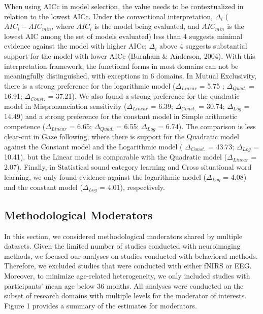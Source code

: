 \documentclass[10pt, letterpaper]{article}
\begin{document}
When using AICc in model selection, the value needs to be contextualized
in relation to the lowest AICc. Under the conventional interpretation,
\(\Delta_{i}\) (\(AIC_i - AIC_{min}\), where \(AIC_i\) is the model
being evaluated, and \(AIC_{min}\) is the lowest AIC among the set of
models evaluated) less than 4 suggests minimal evidence against the
model with higher AICc; \(\Delta_{i}\) above 4 suggests substantial
support for the model with lower AICc (Burnham \& Anderson, 2004). With
this interpretation framework, the functional forms in most domains can
not be meaningfully distinguished, with exceptions in 6 domains. In
Mutual Exclusivity, there is a strong preference for the logarithmic
model (\(\Delta_{Linear}\) = 5.75 ; \(\Delta_{Quad.}\) = 16.91;
\(\Delta_{Const.}\) = 37.21). We also found a strong preference for the
quadratic model in Mispronunciation sensitivity (\(\Delta_{Linear}\) =
6.39; \(\Delta_{Const.}\) = 30.74; \(\Delta_{Log}\) = 14.49) and a
strong preference for the constant model in Simple arithmetic competence
(\(\Delta_{Linear}\) = 6.65; \(\Delta_{Quad.}\) = 6.55; \(\Delta_{Log}\)
= 6.74). The comparison is less clear-cut in Gaze following, where there
is support for the Quadratic model against the Constant model and the
Logarithmic model ( \(\Delta_{Const.}\) = 43.73; \(\Delta_{Log}\) =
10.41), but the Linear model is comparable with the Quadratic model
(\(\Delta_{Linear}\) = 2.07). Finally, in Statistical sound category
learning and Cross situational word learning, we only found evidence
against the logarithmic model (\(\Delta_{Log}\) = 4.08) and the constant
model (\(\Delta_{Log}\) = 4.01), respectively.

\hypertarget{methodological-moderators}{%
\subsection{Methodological Moderators}\label{methodological-moderators}}

In this section, we considered methodological moderators shared by
multiple datasets. Given the limited number of studies conducted with
neuroimaging methods, we focused our analyses on studies conducted with
behavioral methods. Therefore, we excluded studies that were conducted
with either fNIRS or EEG. Moreover, to minimize age-related
heterogeneity, we only included studies with participants' mean age
below 36 months. All analyses were conducted on the subset of research
domains with multiple levels for the moderator of interests. Figure 1
provides a summary of the estimates for moderators.
\end{document}
